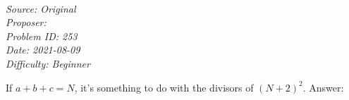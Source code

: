 \SSbreak\\
\emph{Source: Original}\\
\emph{Proposer: \Pnjoy}\\
\emph{Problem ID: 253}\\
\emph{Date: 2021-08-09}\\
\emph{Difficulty: Beginner}\\
\SSbreak

\bigskip

\begin{solution}\hfil\medskip
  
    If $a + b + c = N$, it's something to do with the divisors of $(N + 2)^2$. Answer: \fbox{}
\end{solution}\bigskip
